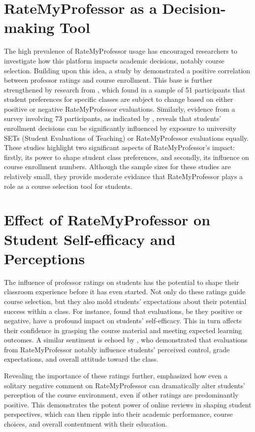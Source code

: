 \documentclass[man,12pt]{apa7}
\begin{document}
\section{RateMyProfessor as a Decision-making Tool}
The high prevalence of RateMyProfessor usage has encouraged researchers to investigate how this platform impacts academic decisions, notably course selection. Building upon this idea, a study by \textcite{johnson_i_2014} demonstrated a positive correlation between professor ratings and course enrollment. This base is further strengthened by research from \textcite{orlova_ratemyprofessorscom_2021}, which found in a sample of 51 participants that student preferences for specific classes are subject to change based on either positive or negative RateMyProfessor evaluations. Similarly, evidence from a survey involving 73 participants, as indicated by \textcite{boswell_effects_2020}, reveals that students' enrollment decisions can be significantly influenced by exposure to university SETs (Student Evaluations of Teaching) or RateMyProfessor evaluations equally. These studies highlight two significant aspects of RateMyProfessor's impact: firstly, its power to shape student class preferences, and secondly, its influence on course enrollment numbers. Although the sample sizes for these studies are relatively small, they provide moderate evidance that RateMyProfessor plays a role as a course selection tool for students.

\section{Effect of RateMyProfessor on Student Self-efficacy and Perceptions}
The influence of professor ratings on students has the potential to shape their classroom experience before it has even started. Not only do these ratings guide course selection, but they also mold students' expectations about their potential success within a class. For instance, \textcite{boswell_effects_2020} found that evaluations, be they positive or negative, have a profound impact on students' self-efficacy. This in turn affects their confidence in grasping the course material and meeting expected learning outcomes. A similar sentiment is echoed by \textcite{kowai-bell_rate_2011}, who demonstrated that evaluations from RateMyProfessor notably influence students' perceived control, grade expectations, and overall attitude toward the class.

Revealing the importance of these ratings further, \textcite{scherr_single_2013} emphasized how even a solitary negative comment on RateMyProfessor can dramatically alter students' perception of the course environment, even if other ratings are predominantly positive. This demonstrates the potent power of online reviews in shaping student perspectives, which can then ripple into their academic performance, course choices, and overall contentment with their education.
\end{document}

